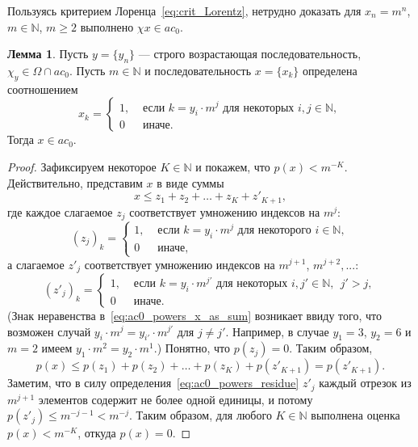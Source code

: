\documentclass[a4paper,openbib]{article}
\renewcommand{\leq}{\leqslant}
\renewcommand{\geq}{\geqslant} %
\theoremstyle{definition}
\newtheorem{lemma}{Лемма}[section]
\begin{document}
Пользуясь критерием Лоренца~\eqref{eq:crit_Lorentz},
нетрудно доказать для $x_n = m^n$, $m\in\mathbb{N}$, $m\geq 2$ выполнено $\chi x \in ac_0$.

\begin{lemma}
	Пусть $y = \{y_n\}$ --- строго возрастающая последовательность,
	$\chi_y\in\Omega \cap ac_0$.
	Пусть $m \in \mathbb{N}$
	и последовательность $x=\{x_k\}$ определена соотношением
	\begin{equation}
		x_k = \begin{cases}
			1, &\mbox{~если~} k = y_i \cdot m^j \mbox{~для некоторых~} i,j\in\mathbb{N},
			\\
			0  &\mbox{~иначе}
			.
		\end{cases}
	\end{equation}
	Тогда $x\in ac_0$.
\end{lemma}

\begin{proof}
	Зафиксируем некоторое $K \in \mathbb{N}$ и покажем, что $p(x) < m^{-K}$.
	Действительно, представим $x$ в виде суммы
	\begin{equation}
		\label{eq:ac0_powers_x_as_sum}
		x \leq z_1 + z_2 + \dots + z_K + z'_{K+1}
		,
	\end{equation}
	где каждое слагаемое $z_j$ соответствует умножению индексов на $m^j$:
	\begin{equation}
		(z_j)_k = \begin{cases}
			1, &\mbox{~если~} k = y_i \cdot m^j \mbox{~для некоторого~} i\in\mathbb{N},
			\\
			0  &\mbox{~иначе}
			,
		\end{cases}
	\end{equation}
	а слагаемое $z'_j$ соответствует умножению индексов на $m^{j+1}$, $m^{j+2},...$:
	\begin{equation}
		\label{eq:ac0_powers_residue}
		(z'_j)_k = \begin{cases}
			1, &\mbox{~если~} k = y_i \cdot m^{j'} \mbox{~для некоторых~} i,j'\in\mathbb{N},~~ j' > j
			,%
			\\
			0  &\mbox{~иначе}
			.
		\end{cases}
	\end{equation}
	(Знак неравенства в~\eqref{eq:ac0_powers_x_as_sum} возникает ввиду того, что возможен случай
	$y_i \cdot m^j = y_{i'} \cdot m^{j'}$ для $j\neq j'$.
	Например, в случае $y_1 = 3$, $y_2 = 6$ и $m=2$ имеем $y_1 \cdot m^2 = y_2 \cdot m^1$.)
	Понятно, что $p(z_j)=0$.
	Таким образом,
	\begin{equation}
		p(x) \leq p(z_1) + p(z_2) + \dots + p(z_K) + p(z'_{K+1}) = p(z'_{K+1})
		.
	\end{equation}
	Заметим, что в силу определения~\eqref{eq:ac0_powers_residue} $z'_j$ каждый отрезок из $m^{j+1}$ элементов
	содержит не более одной единицы, и потому $p(z'_j) \leq m^{-j-1} < m^{-j}$.
	Таким образом, для любого $K\in\mathbb{N}$ выполнена оценка $p(x) < m^{-K}$,
	откуда $p(x) = 0$.
\end{proof}
\end{document}

